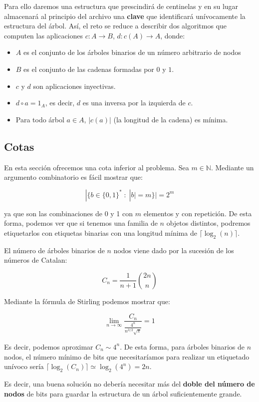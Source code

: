\documentclass{article}
\begin{document}
Para ello daremos una estructura que prescindirá de centinelas y en su lugar
almacenará al principio del archivo una \textbf{clave} que identificará
unívocamente la estructura del árbol. Así, el reto se reduce a describir dos
algoritmos que computen las aplicaciones $c: A \to B$, $d: c(A) \to A$, donde:

\begin{itemize}
	\item $A$ es el conjunto de los árboles binarios de un número arbitrario de nodos
	\item $B$ es el conjunto de las cadenas formadas por $0$ y $1$.
	\item $c$ y $d$ son aplicaciones inyectivas.
	\item $d \circ a = 1_A$, es decir, $d$ es una inversa por la izquierda de $c$.
	\item Para todo árbol $a \in A$, $|c(a)|$ (la longitud de la cadena) es mínima.
\end{itemize}

\subsection{Cotas}

En esta sección ofrecemos una cota inferior al problema. Sea $m \in \mathbb{N}$.
Mediante un argumento combinatorio es fácil mostrar que:

\[|\{b \in \{0,1\}^{\ast} \; : \; |b| = m\}| = 2^m\]

ya que son las combinaciones de 0 y 1 con $m$ elementos y con repetición. De esta
forma, podemos ver que si tenemos una familia de $n$ objetos distintos, podremos
etiquetarlos con etiquetas binarias con una longitud mínima de
$\lceil \log_2(n) \rceil$.

El número de árboles binarios de $n$ nodos viene dado por la sucesión de los números
de Catalan:

\[C_n = \frac{1}{n+1} {2n\choose n} \]

Mediante la fórmula de Stirling podemos mostrar que:

\[\lim_{n \to \infty} \frac{C_n}{\frac{4^n}{n^{3/2}\sqrt{\pi}}} = 1\]

Es decir, podemos aproximar $C_n \sim 4^n$. De esta forma, para árboles binarios
de $n$ nodos, el número mínimo de bits que necesitaríamos para realizar un
etiquetado unívoco sería $\lceil \log_2(C_n) \rceil \simeq \log_2(4^n) = 2n$.

Es decir, una buena solución no debería necesitar más del
\textbf{doble del número de nodos} de bits para guardar la estructura de un
árbol suficientemente grande.
\end{document}
